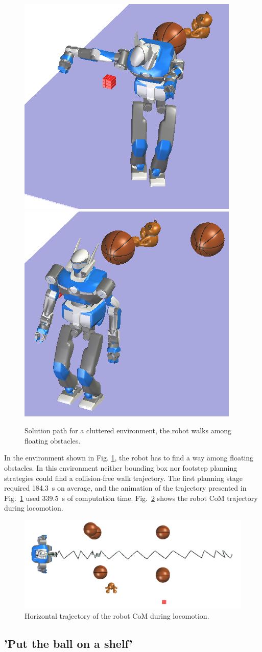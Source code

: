 \documentclass{article}
\begin{document}
\begin{figure}[h!]
\includegraphics[width=0.24\linewidth]{pics/objects-cloud/perspective-7.png}
\includegraphics[width=0.24\linewidth]{pics/objects-cloud/perspective-8.png}

\caption{Solution path for a cluttered environment, the robot walks
  among floating obstacles.}
\label{fig:cluttered}
\end{figure}

In the environment shown in Fig. \ref{fig:cluttered}, the robot
has to find a way among floating obstacles. In this
environment neither bounding box nor footstep planning strategies
could find a collision-free walk trajectory.
The first planning stage required
184.3~s on average, and the animation of the trajectory presented in 
Fig.~\ref{fig:cluttered} used 339.5~s of computation time. Fig.~\ref{fig:cluttered-waist} 
shows the robot CoM trajectory during locomotion.

\begin{figure}[h!]
  \centering
  \includegraphics[width=0.7\linewidth]{pics/objects-cloud/waist-trajectory.png}

  \caption{Horizontal trajectory of the robot CoM during
    locomotion.}
  \label{fig:cluttered-waist} 
\end{figure}


\subsection{'Put the ball on a shelf'}
\end{document}
